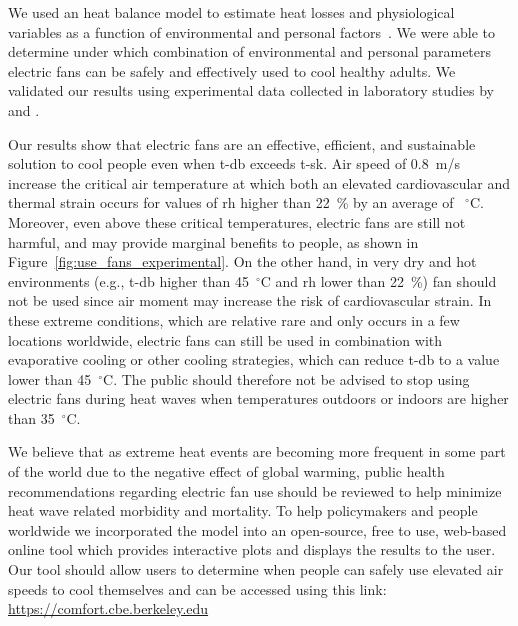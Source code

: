 We used an heat balance model to estimate heat losses and physiological variables as a function of environmental and personal factors~\cite{Gagge1986}.
We were able to determine under which combination of environmental and personal parameters electric fans can be safely and effectively used to cool healthy adults.
We validated our results using experimental data collected in laboratory studies by  and .

Our results show that electric fans are an effective, efficient, and sustainable solution to cool people even when \ac{t-db} exceeds \ac{t-sk}.
Air speed of 0.8~m/s increase the critical air temperature at which both an elevated cardiovascular and thermal strain occurs for values of \ac{rh} higher than 22~\% by an average of ~$^{\circ}$C.
Moreover, even above these critical temperatures, electric fans are still not harmful, and may provide marginal benefits to people, as shown in Figure~\ref{fig:use_fans_experimental}.
On the other hand, in very dry and hot environments (e.g., \ac{t-db} higher than 45~$^{\circ}$C and \ac{rh} lower than 22~\%) fan should not be used since air moment may increase the risk of cardiovascular strain.
In these extreme conditions, which are relative rare and only occurs in a few locations worldwide, electric fans can still be used in combination with evaporative cooling or other cooling strategies, which can reduce \ac{t-db} to a value lower than 45~$^{\circ}$C.
The public should therefore not be advised to stop using electric fans during  heat waves when temperatures outdoors or indoors are higher than 35~$^{\circ}$C\@. 

We believe that as extreme heat events are becoming more frequent in some part of the world due to the negative effect of global warming, public health recommendations regarding electric fan use should be reviewed to help minimize heat wave related morbidity and mortality. 
To help policymakers and people worldwide we incorporated the model into an open-source, free to use, web-based online tool which provides interactive plots and displays the results to the user.
Our tool should allow users to determine when people can safely use elevated air speeds to cool themselves and can be accessed using this link: \url{https://comfort.cbe.berkeley.edu}